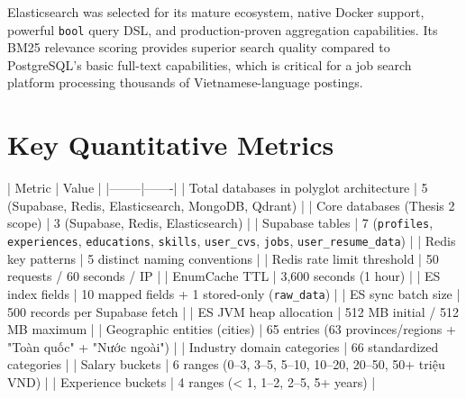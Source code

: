 Elasticsearch was selected for its mature ecosystem, native Docker support, powerful \texttt{bool} query DSL, and production-proven aggregation capabilities. Its BM25 relevance scoring provides superior search quality compared to PostgreSQL's basic full-text capabilities, which is critical for a job search platform processing thousands of Vietnamese-language postings.

\section{Key Quantitative Metrics}

| Metric | Value |
|--------|-------|
| Total databases in polyglot architecture | 5 (Supabase, Redis, Elasticsearch, MongoDB, Qdrant) |
| Core databases (Thesis 2 scope) | 3 (Supabase, Redis, Elasticsearch) |
| Supabase tables | 7 (\texttt{profiles}, \texttt{experiences}, \texttt{educations}, \texttt{skills}, \texttt{user\_cvs}, \texttt{jobs}, \texttt{user\_resume\_data}) |
| Redis key patterns | 5 distinct naming conventions |
| Redis rate limit threshold | 50 requests / 60 seconds / IP |
| EnumCache TTL | 3,600 seconds (1 hour) |
| ES index fields | 10 mapped fields + 1 stored-only (\texttt{raw\_data}) |
| ES sync batch size | 500 records per Supabase fetch |
| ES JVM heap allocation | 512 MB initial / 512 MB maximum |
| Geographic entities (cities) | 65 entries (63 provinces/regions + "Toàn quốc" + "Nước ngoài") |
| Industry domain categories | 66 standardized categories |
| Salary buckets | 6 ranges (0–3, 3–5, 5–10, 10–20, 20–50, 50+ triệu VND) |
| Experience buckets | 4 ranges (< 1, 1–2, 2–5, 5+ years) |
